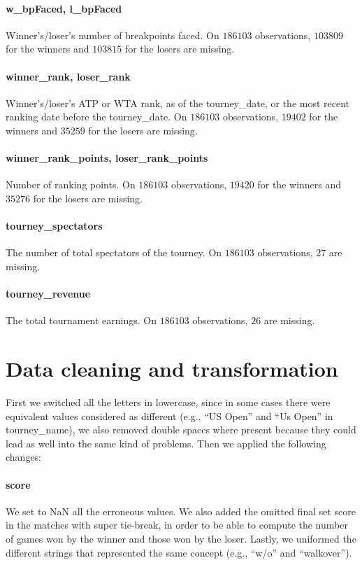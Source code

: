 \documentclass{article}
\begin{document}
\paragraph{w\_bpFaced, l\_bpFaced}
Winner's/loser's number of breakpoints faced. On $186103$ observations, $103809$ for the winners and $103815$ for the losers are missing.

\paragraph{winner\_rank, loser\_rank}
Winner's/loser's ATP or WTA rank, as of the tourney\_date, or the most recent ranking date before the tourney\_date. On $186103$ observations, $19402$ for the winners and $35259$ for the losers are missing.

\paragraph{winner\_rank\_points, loser\_rank\_points}
Number of ranking points. On $186103$ observations, $19420$ for the winners and $35276$ for the losers are missing.

\paragraph{tourney\_spectators}
The number of total spectators of the tourney. On $186103$ observations, $27$ are missing.

\paragraph{tourney\_revenue}
The total tournament earnings. On $186103$ observations, $26$ are missing.

\section{Data cleaning and transformation}

First we switched all the letters in lowercase, since in some cases there were equivalent values considered as different (e.g., “US Open” and “Us Open” in tourney\_name), we also removed double spaces where present because they could lead as well into the same kind of problems. Then we applied the following changes:

\paragraph{score}
We set to NaN all the erroneous values. We also added the omitted final set score in the matches with super tie-break, in order to be able to compute the number of games won by the winner and those won by the loser. Lastly, we uniformed the different strings that represented the same concept (e.g., “w/o” and “walkover”).
\end{document}
